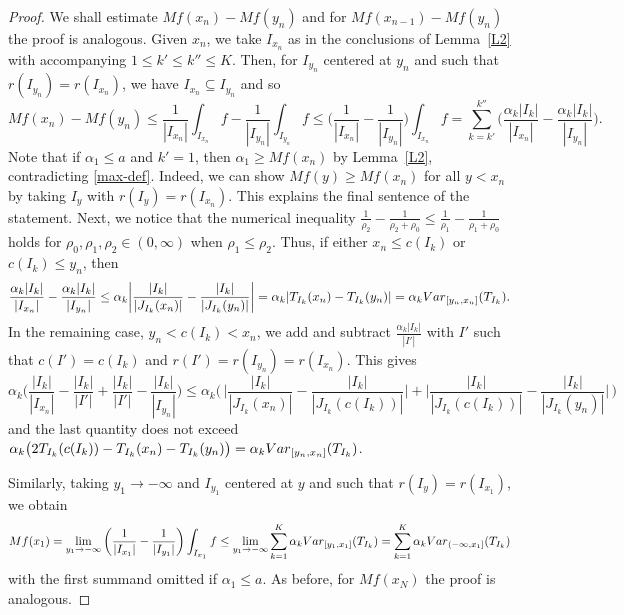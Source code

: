 \documentclass[10pt,a4paper]{amsart}
\newcommand{\Var}{{\rm Var}}
\begin{document}
	\begin{proof}
		We shall estimate $Mf(x_n) - Mf(y_n)$ and for $Mf(x_{n-1}) - Mf(y_{n})$ the proof is analogous.
		Given $x_n$, we take $I_{x_n}$ as in the conclusions of Lemma~\ref{L2} with accompanying $1\le k'\le k''\le K$.
		Then, for $I_{y_n}$  centered at $y_n$ and such that $r(I_{y_n}) = r(I_{x_n})$, we have $I_{x_n} \subseteq I_{y_n}$ and so
		\[
		Mf(x_n) - Mf(y_n) \leq 
		\frac{1}{|I_{x_n}|}\int_{I_{x_n}} f - \frac{1}{|I_{y_n}|}\int_{I_{y_n}} f 
		\leq \bigg( \frac{1}{|I_{x_n}|} - \frac{1}{|I_{y_n}|} \bigg) \int_{I_{x_n}} f
		= \sum_{k=k'}^{k''} 
		\bigg( \frac{\alpha_k |I_k|}{|I_{x_n}|} -  \frac{\alpha_k |I_k|}{|I_{y_n}|} \bigg).
		\] 
		Note that if $\alpha_1 \leq a$ and $k'=1$, then $\alpha_1 \geq Mf(x_n)$ by Lemma~\ref{L2}, contradicting \eqref{max-def}. Indeed, we can show $Mf(y) \geq Mf(x_n)$ for all 
		$y < x_n$ by taking $I_y$ with $r(I_y) = r(I_{x_n})$. This explains the final sentence of the statement. Next, we notice that the numerical inequality $ \frac{1}{\rho_2} - \frac{1}{\rho_2 + \rho_0}\le \frac{1}{\rho_1} - \frac{1}{\rho_1 + \rho_0}$ holds for $\rho_0, \rho_1, \rho_2 \in (0,\infty)$ when $\rho_1 \leq \rho_2$. Thus, if either $x_n \leq c(I_k)$ or $c(I_k) \leq y_n$, then 
		\[
		\frac{\alpha_k |I_k|}{|I_{x_n}|} -  \frac{\alpha_k |I_k|}{|I_{y_n}|}
		\leq 
		\alpha_k \bigg| \frac{|I_k|}{|J_{I_k}(x_n)|} -  \frac{|I_k|}{|J_{I_k}(y_n)|} \bigg|
		= \alpha_k |T_{I_k}(x_n) - T_{I_k}(y_n)| = \alpha_k \Var_{[y_n, x_n]} (T_{I_k}).
		\]
		In the remaining case, $y_n < c(I_k) < x_n$, we add and subtract $\frac{\alpha_k |I_k|}{|I'|}$ with $I'$ such that $c(I') = c(I_k)$ and $r(I') = r(I_{y_n}) = r(I_{x_n})$. This gives 
		\[
		\alpha_k \bigg( \frac{|I_k|}{|I_{x_n}|} - \frac{|I_k|}{|I'|} + \frac{|I_k|}{|I'|} -  \frac{|I_k|}{|I_{y_n}|} \bigg)
		\leq 
		\alpha_k \bigg( \, \bigg| \frac{|I_k|}{|J_{I_k}(x_n)|} -  \frac{|I_k|}{|J_{I_k}(c(I_k))|} \bigg|
		+ \bigg| \frac{|I_k|}{|J_{I_k}(c(I_k))|} -  \frac{ |I_k|}{|J_{I_k}(y_n)|} \bigg| \, \bigg) 
		\]
		and the last quantity does not exceed 
		$\alpha_k \big(2T_{I_k}(c(I_k)) - T_{I_k}(x_n) - T_{I_k}(y_n)\big) = \alpha_k \Var_{[y_n, x_n]} (T_{I_k})$.
		
		Similarly, taking $y_1 \to -\infty$ and $I_{y_1}$ centered at $y$ and such that $r(I_{y}) = r(I_{x_1})$, we obtain
		\[
		Mf(x_1)
		= \lim_{y_1 \to -\infty} \bigg( \frac{1}{|I_{x_1}|} - \frac{1}{|I_{y_1}|} \bigg) \int_{I_{x_1}} f 
		\leq \lim_{y_1 \to -\infty} \sum_{k=1}^K \alpha_k \Var_{[y_1, x_1]} (T_{I_k})
		= \sum_{k=1}^K \alpha_k \Var_{(-\infty, x_1]} (T_{I_k})
		\]
		with the first summand omitted if $\alpha_1 \leq a$. As before, for $Mf(x_{N})$ the proof is analogous. 
	\end{proof} 
\end{document}

